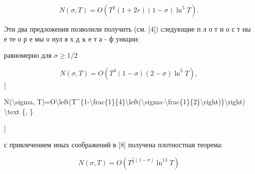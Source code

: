 \documentclass[10pt]{article}
\begin{document}
\[

N(\sigma, T)=O\left(T^{2}(1+2 r)(1-\sigma) \ln ^{5} T\right) .

\]



Эти два предложения позволили получить (см. [4]) следующие п л о т н о с т ны е те о р е мы о нул я х д $\mathbf{x}$ е т а - ф ункции:



равномерно для $\sigma \geqslant 1 / 2$



\[

N(\sigma, T)=O\left(T^{3}(1-\sigma)(2-\sigma) \ln ^{5} T\right),

\][



N(\textbackslash sigma, T)=O\textbackslash left(T\^{}\{1-\textbackslash frac\{1\}\{4\}\textbackslash left(\textbackslash sigma-\textbackslash frac\{1\}\{2\}\textbackslash right)\}\textbackslash right) \textbackslash text \{, \}

]



с привлечением иных соображений в [8] получена плотностная теорема:



\[

N(\sigma, T)=O\left(T^{\frac{5}{2}(1-\sigma)} \ln ^{13} T\right)

\]
\end{document}
